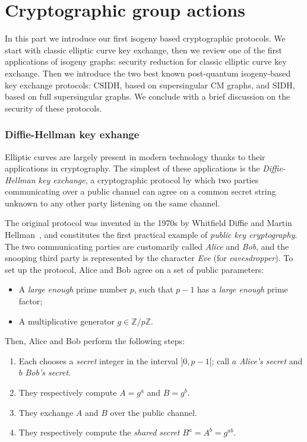 \documentclass[10pt]{article}
\theoremstyle{plain}
\theoremstyle{definition}
\begin{document}
\clearpage
\part{Cryptographic group actions}

In this part we introduce our first isogeny based cryptographic
protocols. %
We start with classic elliptic curve key exchange, then we review one
of the first applications of isogeny graphs: security reduction for
classic elliptic curve key exchange. %
Then we introduce the two best known post-quantum isogeny-based key
exchange protocols: CSIDH, based on supersingular CM graphs, and SIDH,
based on full supersingular graphs. %
We conclude with a brief discussion on the security of these protocols.


\section{Diffie-Hellman key exhange}
\label{sec:appl-diff-hellm}

Elliptic curves are largely present in modern technology thanks to
their applications in cryptography. %
The simplest of these applications is the \emph{Diffie-Hellman key
  exchange}, a cryptographic protocol by which two parties
communicating over a public channel can agree on a common secret
string unknown to any other party listening on the same channel.

The original protocol was invented in the 1970s by Whitfield Diffie
and Martin Hellman~\cite{DifHel76}, and constitutes the first practical
example of \emph{public key cryptography}. %
The two communicating parties are customarily called \emph{Alice} and
\emph{Bob}, and the snooping third party is represented by the
character \emph{Eve} (for \emph{eavesdropper}). %
To set up the protocol, Alice and Bob agree on a set of public
parameters:
\begin{itemize}
\item A \emph{large enough} prime number $p$, such that $p-1$ has a
  \emph{large enough} prime factor;
\item A multiplicative generator $g∈ℤ/pℤ$.
\end{itemize}

Then, Alice and Bob perform the following steps:
\begin{enumerate}
\item Each chooses a \emph{secret} integer in the interval $]0,p-1[$;
  call $a$ \emph{Alice's secret} and $b$ \emph{Bob's secret}.
\item They respectively compute $A=g^a$ and $B=g^b$.
\item They exchange $A$ and $B$ over the public channel.
\item They respectively compute the \emph{shared secret}
  $B^a=A^b=g^{ab}$.
\end{enumerate}
\end{document}
